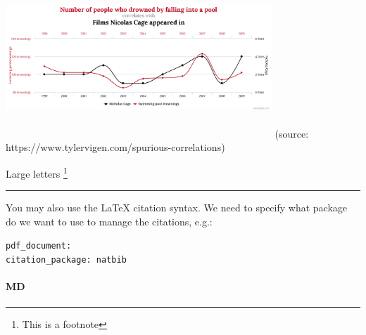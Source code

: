 \documentclass[
  11pt,
]{article}
\begin{document}
\begin{center} %
  \includegraphics[width=10cm, height=6cm, keepaspectratio]{img/chart.png}  
(source: https://www.tylervigen.com/spurious-correlations)
\end{center}
\newpage

\Large Large letters \footnote{This is a footnote}

\begin{center}\rule{0.5\linewidth}{0.5pt}\end{center}

You may also use the LaTeX citation syntax. We need to specify what
package do we want to use to manage the citations, e.g.:

\texttt{pdf\_document:}\\
\texttt{citation\_package:\ natbib}

\hypertarget{md}{%
\paragraph{MD}\label{md}}
\end{document}
